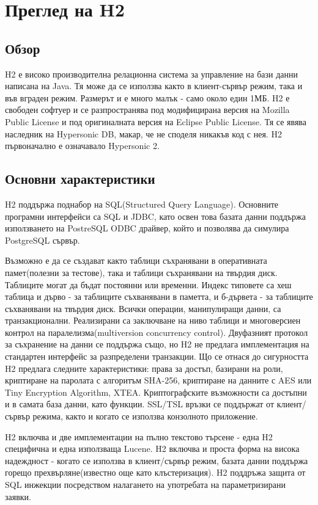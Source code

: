 \section{Преглед на H2}
\subsection{Обзор}
H2 е високо производителна релационна система за управление на бази
данни написана на Java. Тя може да се използва както в клиент-сървър
режим, така и във вграден режим. Размерът и е много малък - само около
един 1МБ. H2 е свободен софтуер и се разпространява под модифицирана
версия на Mozilla Public License и под оригиналната версия на Eclipse
Public License. Тя се явява наследник на Hypersonic DB, макар, че не
споделя никакъв код с нея. H2 първоначално е означавало Hypersonic 2.

\subsection{Основни характеристики}
H2 поддържа поднабор на SQL(Structured Query Language). Основните
програмни интерфейси са SQL и JDBC, като освен това базата данни
поддържа използването на PostreSQL ODBC драйвер, който и позволява да
симулира PostgreSQL сървър.

Възможно е да се създават както таблици съхранявани в оперативната
памет(полезни за тестове), така и таблици съхранявани на твърдия
диск. Таблиците могат да бъдат постоянни или временни. Индекс типовете
са хеш таблица и дърво - за таблиците съхванявани в паметта, и
б-дървета - за таблиците съхванявани на твърдия диск. Всички операции,
манипулиращи данни, са транзакционални. Реализирани са заключване на
ниво таблици и многоверсиен контрол на паралелизма(multiversion
concurrency control). Двуфазният протокол за съхранение на данни се
поддържа също, но H2 не предлага имплементация на стандартен интерфейс
за разпределени транзакции. Що се отнася до сигурността H2 предлага
следните характеристики: права за достъп, базирани на роли, криптиране
на паролата с алгоритъм SHA-256, криптиране на данните с AES или Tiny
Encryption Algorithm, XTEA. Криптографските възможности са достъпни и
в самата база данни, като функции. SSL/TSL връзки се поддържат от
клиент/сървър режима, както и когато се използва конзолното
приложение.

H2 включва и две имплементации на пълно текстово търсене - една H2
специфична и една използваща Lucene. H2 включва и проста форма на
висока надеждност - когато се използва в клиент/сървър режим, базата
данни поддържа горещо прехвърляне(известно още като клъстеризация). H2
поддръжа защита от SQL инжекции посредством налагането на употребата
на параметризирани заявки.  
